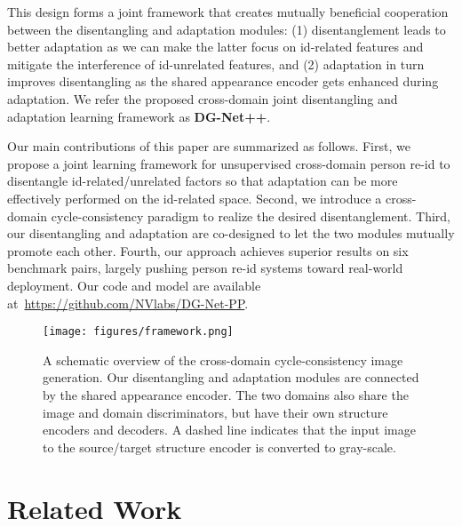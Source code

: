 \documentclass[runningheads]{llncs}
\begin{document}
This design forms a joint framework that creates mutually beneficial cooperation between the disentangling and adaptation modules: (1) disentanglement leads to better adaptation as we can make the latter focus on id-related features and mitigate the interference of id-unrelated features, and (2) adaptation in turn improves disentangling as the shared appearance encoder gets enhanced during adaptation. We refer the proposed cross-domain joint disentangling and adaptation learning framework as \textbf{DG-Net++}. 

Our main contributions of this paper are summarized as follows. First, we propose a joint learning framework for unsupervised cross-domain person re-id to disentangle id-related/unrelated factors so that adaptation can be more effectively performed on the id-related space. Second, we introduce a cross-domain cycle-consistency paradigm to realize the desired disentanglement. Third, our disentangling and adaptation are co-designed to let the two modules mutually promote each other. Fourth, our approach achieves superior results on six benchmark pairs, largely pushing person re-id systems toward real-world deployment. Our code and model are available at~\url{https://github.com/NVlabs/DG-Net-PP}. 

















\begin{figure*}[!t]
	\centering
	\texttt{[image: figures/framework.png]}
\caption{A schematic overview of the cross-domain cycle-consistency image generation. Our disentangling and adaptation modules are connected by the shared appearance encoder. The two domains also share the image and domain discriminators, but have their own structure encoders and decoders. A dashed line indicates that the input image to the source/target structure encoder is converted to gray-scale.}
	\vspace{-10pt}
	\label{fig:cycle}
\end{figure*}













\section{Related Work}
\end{document}
